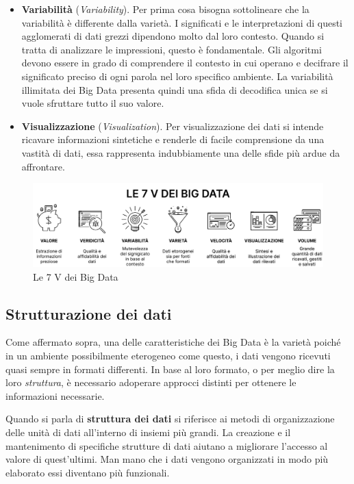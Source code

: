 \begin{itemize}
    \item \textbf{Variabilità} (\textit{Variability}). Per prima cosa bisogna sottolineare che la variabilità è differente dalla varietà. I significati e le interpretazioni di questi agglomerati di dati grezzi dipendono molto dal loro contesto. Quando si tratta di analizzare le impressioni, questo è fondamentale. Gli algoritmi devono essere in grado di comprendere il contesto in cui operano e decifrare il significato preciso di ogni parola nel loro specifico ambiente. La variabilità illimitata dei Big Data presenta quindi una sfida di decodifica unica se si vuole sfruttare tutto il suo valore.
    \item \textbf{Visualizzazione} (\textit{Visualization}). Per visualizzazione dei dati si intende ricavare informazioni sintetiche e renderle di facile comprensione da una vastità di dati, essa rappresenta indubbiamente una delle sfide più ardue da affrontare.
\end{itemize}

\begin{figure}[h!]
    \centering
    \includegraphics[width=1\linewidth]{figure/capitolo_2/Le 7 V dei Big Data.pdf}
    \caption{Le 7 V dei Big Data}
    \label{fig:Le 7 V dei Big Data}
\end{figure}

\subsection{Strutturazione dei dati}

Come affermato sopra, una delle caratteristiche dei Big Data è la varietà poiché in un ambiente possibilmente eterogeneo come questo, i dati vengono ricevuti quasi sempre in formati differenti. In base al loro formato, o per meglio dire la loro \textit{struttura}, è necessario adoperare approcci distinti per ottenere le informazioni necessarie.

Quando si parla di \textbf{struttura dei dati} si riferisce ai metodi di organizzazione delle unità di dati all'interno di insiemi più grandi. La creazione e il mantenimento di specifiche strutture di dati aiutano a migliorare l'accesso al valore di quest'ultimi. Man mano che i dati vengono organizzati in modo più elaborato essi diventano più funzionali.\cite{theastrologypage_data_structure}

